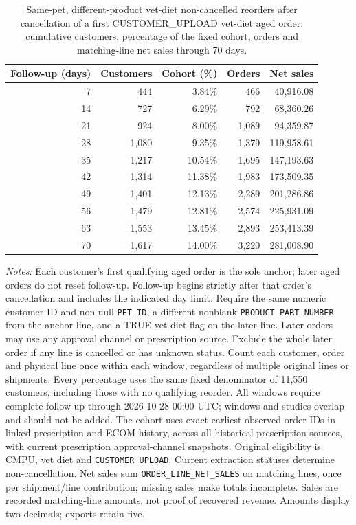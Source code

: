 \begin{table}[!htbp]
\centering
\caption{Same-pet, different-product vet-diet non-cancelled reorders after cancellation of a first CUSTOMER\_UPLOAD vet-diet aged order: cumulative customers, percentage of the fixed cohort, orders and matching-line net sales through 70 days.}
\label{tab:financial-opportunity-new-upload-same-pet-different-part}
\begin{tabular}{@{}rrrrr@{}}
\toprule
Follow-up (days) & Customers & Cohort (\%) & Orders & Net sales \\
\midrule
7 & 444 & 3.84\% & 466 & 40,916.08 \\
14 & 727 & 6.29\% & 792 & 68,360.26 \\
21 & 924 & 8.00\% & 1,089 & 94,359.87 \\
28 & 1,080 & 9.35\% & 1,379 & 119,958.61 \\
35 & 1,217 & 10.54\% & 1,695 & 147,193.63 \\
42 & 1,314 & 11.38\% & 1,983 & 173,509.35 \\
49 & 1,401 & 12.13\% & 2,289 & 201,286.86 \\
56 & 1,479 & 12.81\% & 2,574 & 225,931.09 \\
63 & 1,553 & 13.45\% & 2,893 & 253,413.39 \\
70 & 1,617 & 14.00\% & 3,220 & 281,008.90 \\
\bottomrule
\end{tabular}

\begin{minipage}{\linewidth}
\footnotesize
\textit{Notes:} Each customer's first qualifying aged order is the sole anchor;
later aged orders do not reset follow-up. Follow-up begins strictly after that
order's cancellation and includes the indicated day limit. Require the same numeric customer ID and non-null \texttt{PET\_ID}, a different nonblank \texttt{PRODUCT\_PART\_NUMBER} from the anchor line, and a TRUE vet-diet flag on the later line. Later orders may use any approval channel or prescription
source. Exclude the whole later order if any line is cancelled or has unknown
status. Count each customer, order and physical line once within each window,
regardless of multiple original lines or shipments. Every percentage uses the
same fixed denominator of 11,550 customers, including those with no
qualifying reorder. All windows require complete follow-up through
2026-10-28 00:00 UTC; windows and studies overlap and should not be added.
The cohort uses exact earliest observed order IDs in linked prescription and
ECOM history, across all historical prescription sources, with current
prescription approval-channel snapshots. Original eligibility is CMPU,
vet diet and \texttt{CUSTOMER\_UPLOAD}. Current extraction statuses determine
non-cancellation. Net sales sum \texttt{ORDER\_LINE\_NET\_SALES} on matching
lines, once per shipment/line contribution; missing sales make totals incomplete.
Sales are recorded matching-line amounts, not proof of recovered revenue.
Amounts display two decimals; exports retain five.
\end{minipage}
\end{table}

